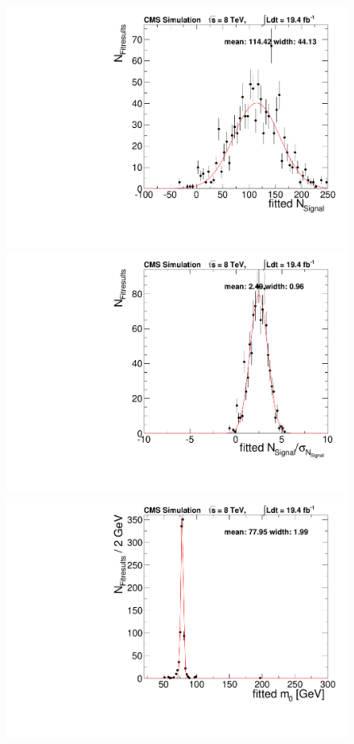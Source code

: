 \begin{figure}[hbp]
  \centering
  \begin{minipage}[t]{0.49\textwidth}
    \includegraphics[width=\textwidth]{plots/results/fit/nSPure_signal120_m078.pdf}
  \end{minipage}
  \begin{minipage}[t]{0.49\textwidth}
    \includegraphics[width=\textwidth]{plots/results/fit/nS_signal120_m078.pdf}
  \end{minipage}
  \begin{minipage}[t]{0.49\textwidth}
    \includegraphics[width=\textwidth]{plots/results/fit/m0_signal120_m078.pdf}

\end{minipage}
\end{figure}
